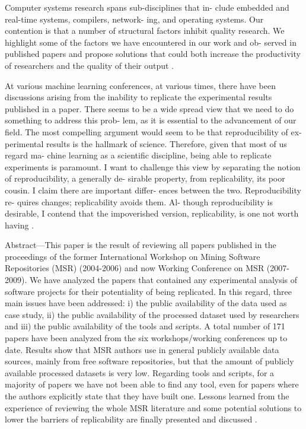 Computer systems research spans sub-disciplines that in-
clude embedded and real-time systems, compilers, network-
ing, and operating systems. Our contention is that a number
of structural factors inhibit quality research. We highlight
some of the factors we have encountered in our work and ob-
served in published papers and propose solutions that could
both increase the productivity of researchers and the quality
of their output \cite{Vitek2011}.

At various machine learning conferences, at
various times, there have been discussions
arising from the inability to replicate the
experimental results published in a paper.
There seems to be a wide spread view that we
need to do something to address this prob-
lem, as it is essential to the advancement
of our field. The most compelling argument
would seem to be that reproducibility of ex-
perimental results is the hallmark of science.
Therefore, given that most of us regard ma-
chine learning as a scientific discipline, being
able to replicate experiments is paramount.
I want to challenge this view by separating
the notion of reproducibility, a generally de-
sirable property, from replicability, its poor
cousin. I claim there are important differ-
ences between the two. Reproducibility re-
quires changes; replicability avoids them. Al-
though reproducibility is desirable, I contend
that the impoverished version, replicability,
is one not worth having \cite{drummond2009replicability}.

Abstract—This paper is the result of reviewing all papers
published in the proceedings of the former International
Workshop on Mining Software Repositories (MSR) (2004-2006)
and now Working Conference on MSR (2007-2009). We have
analyzed the papers that contained any experimental analysis
of software projects for their potentiality of being replicated.
In this regard, three main issues have been addressed: i) the
public availability of the data used as case study, ii) the public
availability of the processed dataset used by researchers and iii)
the public availability of the tools and scripts. A total number of
171 papers have been analyzed from the six workshops/working
conferences up to date. Results show that MSR authors use
in general publicly available data sources, mainly from free
software repositories, but that the amount of publicly available
processed datasets is very low. Regarding tools and scripts, for
a majority of papers we have not been able to find any tool,
even for papers where the authors explicitly state that they have
built one. Lessons learned from the experience of reviewing the
whole MSR literature and some potential solutions to lower the
barriers of replicability are finally presented and discussed
\cite{robles2010replicating}.



